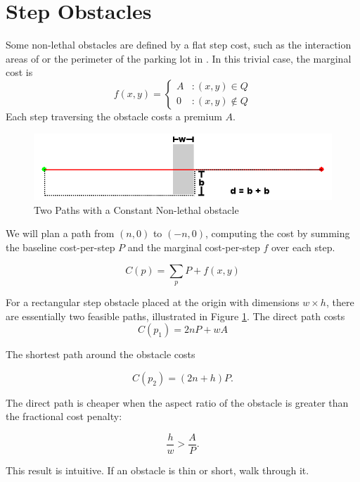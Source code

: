 \section{Step Obstacles}
Some non-lethal obstacles are defined by a flat step cost, such as the interaction areas of \citet{fraichard:anthronav} or the perimeter of the parking lot in \citet{likhachev:costmaps}. In this trivial case, the marginal cost is
\begin{equation}
   \displaystyle
   f(x, y) = \left\{
     \begin{array}{lr}
       A & : (x,y) \in Q\\
       0 & : (x,y) \notin Q
     \end{array}
   \right.
\end{equation}
Each step traversing the obstacle costs a premium $A$. 

\begin{figure}[!t]
\includegraphics[width=\columnwidth]{graphix/Constant.png}
\caption{Two Paths with a Constant Non-lethal obstacle}
\label{fig:constant}
\end{figure}

We will plan a path from $(n, 0)$ to $(-n, 0)$, computing the cost by summing the baseline cost-per-step $P$ and the marginal cost-per-step $f$ over each step.

\begin{equation}
C(p) = \sum\limits_p P + f(x, y)
\end{equation}

For a rectangular step obstacle placed at the origin with dimensions $w\times h$, there are essentially two feasible paths, illustrated in Figure \ref{fig:constant}. The direct path costs
\begin{equation}
C(p_1) = 2nP + wA
\end{equation}

The shortest path around the obstacle costs

\begin{equation}
C(p_2) = (2n + h)P.
\end{equation}

The direct path is cheaper when the aspect ratio of the obstacle  is greater than the fractional cost penalty:

\begin{equation}
\frac{h}{w} > \frac{A}{P}.
\end{equation}

This result is intuitive. If an obstacle is thin or short, walk through it.




